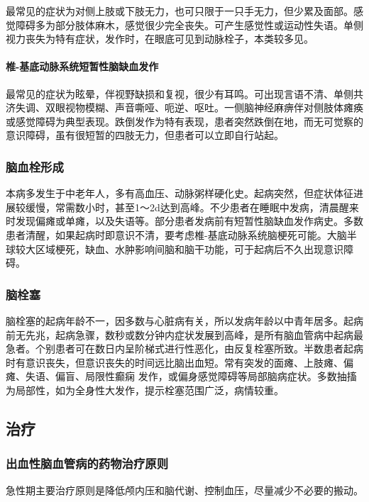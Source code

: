 最常见的症状为对侧上肢或下肢无力，也可只限于一只手无力，但少累及面部。感觉障碍多为部分肢体麻木，感觉很少完全丧失。可产生感觉性或运动性失语。单侧视力丧失为特有症状，发作时，在眼底可见到动脉栓子，本类较多见。
\paragraph{椎-基底动脉系统短暂性脑缺血发作}

最常见的症状为眩晕，伴视野缺损和复视，很少有耳鸣。可出现言语不清、单侧共济失调、双眼视物模糊、声音嘶哑、呃逆、呕吐。一侧脑神经麻痹伴对侧肢体瘫痪或感觉障碍为典型表现。跌倒发作为特有表现，患者突然跌倒在地，而无可觉察的意识障碍，虽有很短暂的四肢无力，但患者可以立即自行站起。

\subsubsection{脑血栓形成}

本病多发生于中老年人，多有高血压、动脉粥样硬化史。起病突然，但症状体征进展较缓慢，常需数小时，甚至1～2d达到高峰。不少患者在睡眠中发病，清晨醒来时发现偏瘫或单瘫，以及失语等。部分患者发病前有短暂性脑缺血发作病史。多数患者清醒，如果起病时即意识不清，要考虑椎-基底动脉系统脑梗死可能。大脑半球较大区域梗死，缺血、水肿影响间脑和脑干功能，可于起病后不久出现意识障碍。

\subsubsection{脑栓塞}

脑栓塞的起病年龄不一，因多数与心脏病有关，所以发病年龄以中青年居多。起病前无先兆，起病急骤，数秒或数分钟内症状发展到高峰，是所有脑血管病中起病最急者。个别患者可在数日内呈阶梯式进行性恶化，由反复栓塞所致。半数患者起病时有意识丧失，但意识丧失的时间远比脑出血短。常有突发的面瘫、上肢瘫、偏瘫、失语、偏盲、局限性癫痫
发作，或偏身感觉障碍等局部脑病症状。多数抽搐为局部性，如为全身性大发作，提示栓塞范围广泛，病情较重。

\subsection{治疗}

\subsubsection{出血性脑血管病的药物治疗原则}

急性期主要治疗原则是降低颅内压和脑代谢、控制血压，尽量减少不必要的搬动。


